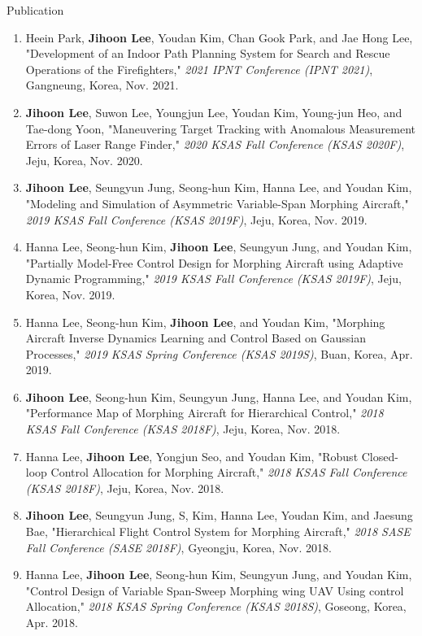 \documentclass{resume} %
\begin{document}
\begin{rSection}{Publication}
\begin{enumerate}
		\item Heein Park, \textbf{Jihoon Lee}, Youdan Kim, Chan Gook Park, and Jae Hong Lee, "Development of an Indoor Path Planning System for Search and Rescue Operations of the Firefighters," \textit{2021 IPNT Conference (IPNT 2021)}, Gangneung, Korea, Nov. 2021. 
		
		\item \textbf{Jihoon Lee}, Suwon Lee, Youngjun Lee, Youdan Kim, Young-jun Heo, and Tae-dong Yoon, "Maneuvering Target Tracking with Anomalous Measurement Errors of Laser Range Finder," \textit{2020 KSAS Fall Conference (KSAS 2020F)}, Jeju, Korea, Nov. 2020. 
		
		\item \textbf{Jihoon Lee}, Seungyun Jung, Seong-hun Kim, Hanna Lee, and Youdan Kim, "Modeling and Simulation of Asymmetric Variable-Span Morphing Aircraft," \textit{2019 KSAS Fall Conference (KSAS 2019F)}, Jeju, Korea, Nov. 2019. 
		
		\item Hanna Lee, Seong-hun Kim, \textbf{Jihoon Lee}, Seungyun Jung, and Youdan Kim, "Partially Model-Free Control Design for Morphing Aircraft using Adaptive Dynamic Programming," \textit{2019 KSAS Fall Conference (KSAS 2019F)}, Jeju, Korea, Nov. 2019. 
		
		\item Hanna Lee, Seong-hun Kim, \textbf{Jihoon Lee}, and Youdan Kim, "Morphing Aircraft Inverse Dynamics Learning and Control Based on Gaussian Processes," \textit{2019 KSAS Spring Conference (KSAS 2019S)}, Buan, Korea, Apr. 2019. 
		
		\item \textbf{Jihoon Lee}, Seong-hun Kim, Seungyun Jung, Hanna Lee, and Youdan Kim, "Performance Map of Morphing Aircraft for Hierarchical Control," \textit{2018 KSAS Fall Conference (KSAS 2018F)}, Jeju, Korea, Nov. 2018. 
		
		\item Hanna Lee, \textbf{Jihoon Lee}, Yongjun Seo, and Youdan Kim, "Robust Closed-loop Control Allocation for Morphing Aircraft," \textit{2018 KSAS Fall Conference (KSAS 2018F)}, Jeju, Korea, Nov. 2018. 
		
		\item \textbf{Jihoon Lee}, Seungyun Jung, S, Kim, Hanna Lee, Youdan Kim, and Jaesung Bae, "Hierarchical Flight Control System for Morphing Aircraft," \textit{2018 SASE Fall Conference (SASE 2018F)}, Gyeongju, Korea, Nov. 2018. 
		
		\item Hanna Lee, \textbf{Jihoon Lee}, Seong-hun Kim, Seungyun Jung, and Youdan Kim, "Control Design of Variable Span-Sweep Morphing wing UAV Using control Allocation," \textit{2018 KSAS Spring Conference (KSAS 2018S)}, Goseong, Korea, Apr. 2018. 
		

\end{enumerate}
\end{rSection}
\end{document}
